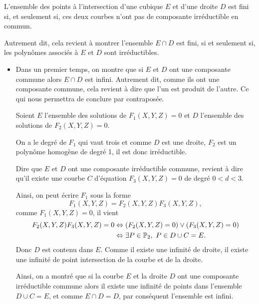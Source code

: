 \begin{proposition}
    \label{prop:intersectionED}
    
    L'ensemble des points à l'intersection d'une cubique $E$ et d'une droite $D$ est fini si, et
    seulement si, ces deux courbes n'ont pas de composante irréductible en commun.
\end{proposition}

Autrement dit, cela revient à montrer l'ensemble $E \cap D$ est fini, si et seulement si, les
polynômes associés à $E$ et $D$ sont irréductibles. 

\begin{demonstration}
    \begin{itemize}
        \item 
    Dans un premier temps, on montre que si $E$ et $D$ ont une composante commune alors $E
    \cap D$ est infini. Autrement dit, comme ils ont une composante commune, cela revient à
    dire que l'un est produit de l'autre. Ce qui nous permettra de conclure par contraposée.

    Soient $E$ l'ensemble des solutions de $F_1(X,Y,Z) = 0$ et $D$ l'ensemble des solutions de
    $F_2(X,Y,Z) = 0$. 

    On a le degré de $F_1$ qui vaut trois et comme $D$ est une droite, $F_2$ est un polynôme
    homogène de degré 1, il est donc irréductible. 

    Dire que $E$ et $D$ ont une composante irréductible commune, revient à dire
    qu'il existe une courbe $C$ d'équation $F_3(X,Y,Z) = 0$ de degré $0<d<3$.

    Ainsi, on peut écrire $F_1$ sous la forme
    \[
    F_1(X,Y,Z) = F_2(X,Y,Z)F_3(X,Y,Z)
    ,\] 
    comme $F_1(X,Y,Z) = 0$, il vient 
    \begin{align*}
        F_2(X,Y,Z)F_3(X,Y,Z) = 0 & \Leftrightarrow \left( F_2(X,Y,Z)=0 \right)  \vee \left( F_3(X,Y,Z) = 0 \right)  \\
                                 & \Leftrightarrow \exists P \in \mathbb{P}_{2},\ P \in D \cup C = E 
    .\end{align*}
    Donc $D$ est contenu dans $E$. Comme il existe une infinité de droite, il existe une
    infinité de point intersection de la courbe et de la droite.

    Ainsi, on a montré que  si la courbe $E$ et la droite $D$ ont une composante irréductible
    commune alors il existe une infinité de points dans l'ensemble $D \cup C = E$, et
    comme $E \cap D = D$, par conséquent l'ensemble est infini.


\end{itemize}
\end{demonstration}
